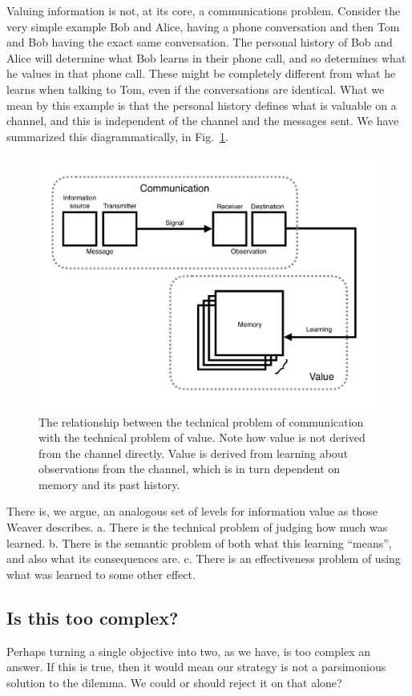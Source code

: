 Valuing information is not, at its core, a communications problem. Consider the very simple example Bob and Alice, having a phone conversation and then Tom and Bob having the exact same conversation. The personal history of Bob and Alice will determine what Bob learns in their phone call, and so determines what he values in that phone call. These might be completely different from what he learns when talking to Tom, even if the conversations are identical. What we mean by this example is that the personal history defines what is valuable on a channel, and this is independent of the channel and the messages sent. We have summarized this diagrammatically, in Fig.~\ref{fig:info1}.

\begin{figure}
	\includegraphics[width=1.0\linewidth]{img/info_diagram.pdf} 
    \caption{The relationship between the technical problem of communication with the technical problem of value. Note how value is not derived from the channel directly. Value is derived from learning about observations from the channel, which is in turn dependent on memory and its past history.
    }
    \label{fig:info1} 
\end{figure}

There is, we argue, an analogous set of levels for information value as those Weaver describes. a. There is the technical problem of judging how much was learned. b. There is the semantic problem of both what this learning ``means'', and also what its consequences are. c. There is an effectiveness problem of using what was learned to some other effect. 

\subsection*{Is this too complex?}
Perhaps turning a single objective into two, as we have, is too complex an answer. If this is true, then it would mean our strategy is not a parsimonious solution to the dilemma. We could or should reject it on that alone?

